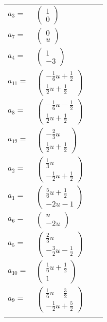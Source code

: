 \documentclass[1p]{elsarticle_modified}
\theoremstyle{definition}
\begin{document}
\begin{tabular}{m{7pt} m{180pt} m{7pt} m{180pt} }
\flushright $a_{3}=$&$\begin{pmatrix}1\\0\end{pmatrix}$ \\
\flushright $a_{7}=$&$\begin{pmatrix}0\\u\end{pmatrix}$ \\
\flushright $a_{4}=$&$\begin{pmatrix}1\\-3\end{pmatrix}$ \\
\flushright $a_{11}=$&$\begin{pmatrix}-\frac{1}{6} u+\frac{1}{2}\\\frac{1}{2} u+\frac{1}{2}\end{pmatrix}$ \\
\flushright $a_{8}=$&$\begin{pmatrix}-\frac{1}{6} u-\frac{1}{2}\\\frac{1}{2} u+\frac{1}{2}\end{pmatrix}$ \\
\flushright $a_{12}=$&$\begin{pmatrix}-\frac{2}{3} u\\\frac{1}{2} u+\frac{1}{2}\end{pmatrix}$ \\
\flushright $a_{2}=$&$\begin{pmatrix}\frac{1}{3} u\\-\frac{1}{2} u+\frac{1}{2}\end{pmatrix}$ \\
\flushright $a_{1}=$&$\begin{pmatrix}\frac{5}{6} u+\frac{1}{2}\\-2 u-1\end{pmatrix}$ \\
\flushright $a_{6}=$&$\begin{pmatrix}u\\-2 u\end{pmatrix}$ \\
\flushright $a_{5}=$&$\begin{pmatrix}\frac{2}{3} u\\-\frac{3}{2} u-\frac{1}{2}\end{pmatrix}$ \\
\flushright $a_{10}=$&$\begin{pmatrix}\frac{1}{6} u+\frac{1}{2}\\1\end{pmatrix}$ \\
\flushright $a_{9}=$&$\begin{pmatrix}\frac{1}{6} u-\frac{3}{2}\\-\frac{1}{2} u+\frac{5}{2}\end{pmatrix}$\\&\end{tabular}
\end{document}
